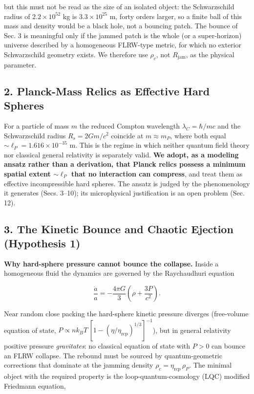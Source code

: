 \documentclass[
]{article}
\begin{document}
but this must not be read as the size of an isolated object: the
Schwarzschild radius of \(2.2\times10^{52}\) kg is \(3.3\times10^{25}\)
m, forty orders larger, so a finite ball of this mass and density would
be a black hole, not a bouncing patch. The bounce of Sec. 3 is
meaningful only if the jammed patch is the whole (or a super-horizon)
universe described by a homogeneous FLRW-type metric, for which no
exterior Schwarzschild geometry exists. We therefore use \(\rho_c\), not
\(R_{\text{jam}}\), as the physical parameter.

\hypertarget{planck-mass-relics-as-effective-hard-spheres}{%
\subsection{\texorpdfstring{\textbf{2. Planck-Mass Relics as Effective
Hard
Spheres}}{2. Planck-Mass Relics as Effective Hard Spheres}}\label{planck-mass-relics-as-effective-hard-spheres}}

For a particle of mass \(m\) the reduced Compton wavelength
\(\lambda_C = \hbar/mc\) and the Schwarzschild radius \(R_s = 2Gm/c^2\)
coincide at \(m \approx m_P\), where both equal
\(\sim\!\ell_P = 1.616\times10^{-35}\) m. This is the regime in which
neither quantum field theory nor classical general relativity is
separately valid. \textbf{We adopt, as a modeling ansatz rather than a
derivation, that Planck relics possess a minimum spatial extent
\(\sim\!\ell_P\) that no interaction can compress}, and treat them as
effective incompressible hard spheres. The ansatz is judged by the
phenomenology it generates (Secs. 3--10); its microphysical
justification is an open problem (Sec. 12).

\hypertarget{the-kinetic-bounce-and-chaotic-ejection-hypothesis-1}{%
\subsection{\texorpdfstring{\textbf{3. The Kinetic Bounce and Chaotic
Ejection (Hypothesis
1)}}{3. The Kinetic Bounce and Chaotic Ejection (Hypothesis 1)}}\label{the-kinetic-bounce-and-chaotic-ejection-hypothesis-1}}

\textbf{Why hard-sphere pressure cannot bounce the collapse.} Inside a
homogeneous fluid the dynamics are governed by the Raychaudhuri equation

\[\frac{\ddot{a}}{a} = -\frac{4\pi G}{3} \left( \rho + \frac{3P}{c^2} \right).\]

Near random close packing the hard-sphere kinetic pressure diverges
(free-volume equation of state,
\(P \propto n k_B T\,[1 - (\eta/\eta_{\text{rcp}})^{1/3}]^{-1}\)), but
in general relativity positive pressure \emph{gravitates}: no classical
equation of state with \(P > 0\) can bounce an FLRW collapse. The
rebound must be sourced by quantum-geometric corrections that dominate
at the jamming density \(\rho_c = \eta_{\text{rcp}}\,\rho_P\). The
minimal object with the required property is the loop-quantum-cosmology
(LQC) modified Friedmann equation,
\end{document}
